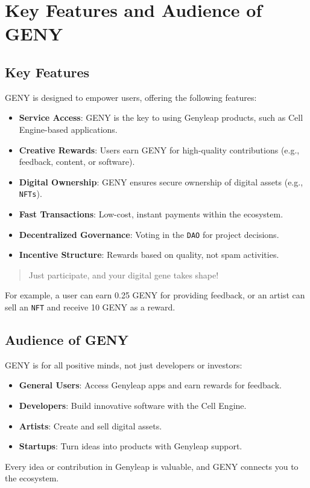 \documentclass[a4paper,12pt,openany]{book}
\begin{document}
\section*{Key Features and Audience of GENY}
\subsection*{Key Features}
GENY is designed to empower users, offering the following features:
\begin{itemize}
    \item \textbf{Service Access}: GENY is the key to using Genyleap products, such as Cell Engine-based applications.
    \item \textbf{Creative Rewards}: Users earn GENY for high-quality contributions (e.g., feedback, content, or software).
    \item \textbf{Digital Ownership}: GENY ensures secure ownership of digital assets (e.g., \texttt{NFTs}).
    \item \textbf{Fast Transactions}: Low-cost, instant payments within the ecosystem.
    \item \textbf{Decentralized Governance}: Voting in the \texttt{DAO} for project decisions.
    \item \textbf{Incentive Structure}: Rewards based on quality, not spam activities.
\end{itemize}
\begin{quote}
Just participate, and your digital gene takes shape!
\end{quote}
For example, a user can earn 0.25 GENY for providing feedback, or an artist can sell an \texttt{NFT} and receive 10 GENY as a reward.

\subsection*{Audience of GENY}
GENY is for all positive minds, not just developers or investors:
\begin{itemize}
    \item \textbf{General Users}: Access Genyleap apps and earn rewards for feedback.
    \item \textbf{Developers}: Build innovative software with the Cell Engine.
    \item \textbf{Artists}: Create and sell digital assets.
    \item \textbf{Startups}: Turn ideas into products with Genyleap support.
\end{itemize}
Every idea or contribution in Genyleap is valuable, and GENY connects you to the ecosystem.
\newpage
\end{document}

